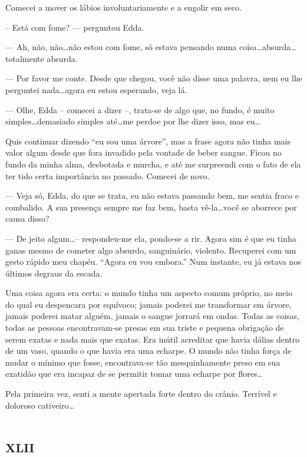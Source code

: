 Comecei a mover os lábios involuntariamente e a engolir em seco.

-- Está com fome? --- perguntou Edda.

--- Ah, não, não\dots não estou com fome, só estava pensando numa coisa\dots absurda\dots totalmente absurda.

--- Por favor me conte. Desde que chegou, você não disse uma palavra, nem eu lhe perguntei nada\dots agora eu estou esperando, veja lá.

--- Olhe, Edda -- comecei a dizer --, trata-se de algo que, no fundo, é muito simples\dots demasiado simples até\dots me perdoe por lhe 
dizer isso, mas eu\dots

Quis continuar dizendo ``eu sou uma árvore'', mas a frase agora não tinha mais valor algum desde que fora invadido pela vontade de beber sangue. Ficou no fundo da minha alma, desbotada e murcha, e até me surpreendi com o fato de ela ter tido certa importância no passado.
Comecei de novo.

--- Veja só, Edda, do que se trata, eu não estava passando bem, me sentia fraco e combalido. A sua presença sempre me faz bem, basta vê-la\dots você se aborrece por causa disso?

--- De jeito algum\dots -- respondeu-me ela, pondo-se a rir.
Agora sim é que eu tinha ganas mesmo de cometer algo absurdo, sanguinário, violento. Recuperei com um gesto rápido meu chapéu. ``Agora eu vou embora.'' Num instante, eu já estava nos últimos degraus da escada.

Uma coisa agora era certa: o mundo tinha um aspecto comum próprio, no meio do qual eu despencara por equívoco; jamais poderei me transformar em árvore, jamais poderei matar alguém, jamais o sangue jorrará em ondas. Todas as coisas, todas as pessoas encontravam-se presas em sua triste e pequena obrigação de serem exatas e nada mais que exatas. Era inútil acreditar que havia dálias dentro de um vaso, quando o que havia era uma echarpe. O mundo não tinha força de mudar o mínimo que fosse, encontrava-se tão mesquinhamente preso em sua exatidão que era incapaz de se permitir tomar uma echarpe por flores\dots

Pela primeira vez, senti a mente apertada forte dentro do crânio. Terrível e doloroso cativeiro\dots


\chapter*{\huge\centering\textsc{xlii}}

